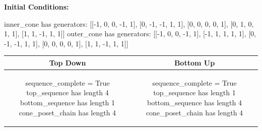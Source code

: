 \documentclass[10pt]{article}
\begin{document}
\textbf{Initial Conditions:}
\begin{SAGE}
inner_cone has generators: 
[[-1, 0, 0, -1, 1], [0, -1, -1, 1, 1], [0, 0, 0, 0, 1], [0, 1, 0, 1, 1], [1, 1, -1, 1, 1]]
outer_cone has generators: 
[[-1, 0, 0, -1, 1], [-1, 1, 1, 1, 1], [0, -1, -1, 1, 1], [0, 0, 0, 0, 1], [1, 1, -1, 1, 1]]

\end{SAGE}
\begin{tabular}{c|c}
\textbf{Top Down} & \textbf{Bottom Up} \\ \hline  
\begin{SAGE}
sequence_complete = True
top_sequence has length 4
bottom_sequence has length 1
cone_poset_chain has length 4
\end{SAGE} 
&
\begin{SAGE}
sequence_complete = True
top_sequence has length 1
bottom_sequence has length 4
cone_poset_chain has length 4
\end{SAGE} 
\\ \hline


\end{tabular}
\end{document}
